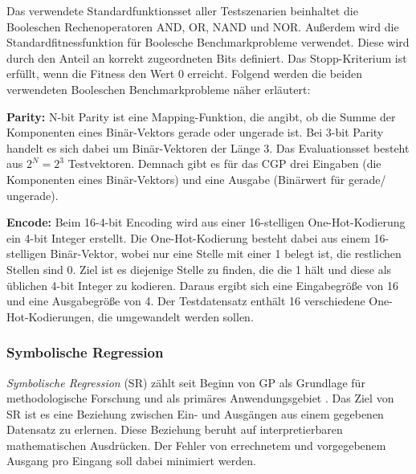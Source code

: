 Das verwendete Standardfunktionsset aller Testszenarien beinhaltet die Booleschen Rechenoperatoren AND, OR, NAND und NOR.
Außerdem wird die Standardfitnessfunktion für Boolesche Benchmarkprobleme verwendet.
Diese wird durch den Anteil an korrekt zugeordneten Bits definiert. \cite{cui_equidistant_2023}
Das Stopp-Kriterium ist erfüllt, wenn die Fitness den Wert 0 erreicht.
Folgend werden die beiden verwendeten Booleschen Benchmarkprobleme näher erläutert:

\textbf{Parity:} N-bit Parity ist eine Mapping-Funktion, die angibt, ob die Summe der Komponenten eines Binär-Vektors gerade oder ungerade ist.
Bei 3-bit Parity handelt es sich dabei um Binär-Vektoren der Länge 3.
Das Evaluationsset besteht aus $2^N=2^3$ Testvektoren. \cite{hohil_1999}
Demnach gibt es für das CGP drei Eingaben (die Komponenten eines Binär-Vektors) und eine Ausgabe (Binärwert für \glqq gerade\grqq\space / \glqq ungerade\grqq).

\textbf{Encode:} Beim 16-4-bit Encoding wird aus einer 16-stelligen One-Hot-Kodierung ein 4-bit Integer erstellt.
Die One-Hot-Kodierung besteht dabei aus einem 16-stelligen Binär-Vektor, wobei nur eine Stelle mit einer 1 belegt ist, die restlichen Stellen sind 0.
Ziel ist es diejenige Stelle zu finden, die die 1 hält und diese als üblichen 4-bit Integer zu kodieren. \cite{cui_weighted_mutation, goldman_2015}
Daraus ergibt sich eine Eingabegröße von 16 und eine Ausgabegröße von 4.
Der Testdatensatz enthält 16 verschiedene One-Hot-Kodierungen, die umgewandelt werden sollen.


\subsubsection{Symbolische Regression}
\label{subsubsec:symbolicRegression}

\emph{Symbolische Regression} (SR) zählt seit Beginn von GP als Grundlage für methodologische Forschung und als primäres Anwendungsgebiet \cite{orzechowski}.
Das Ziel von SR ist es eine Beziehung zwischen Ein- und Ausgängen aus einem gegebenen Datensatz zu erlernen.
Diese Beziehung beruht auf interpretierbaren mathematischen Ausdrücken.
Der Fehler von errechnetem und vorgegebenem Ausgang pro Eingang soll dabei minimiert werden. \cite{makke_interpretable_2024}

